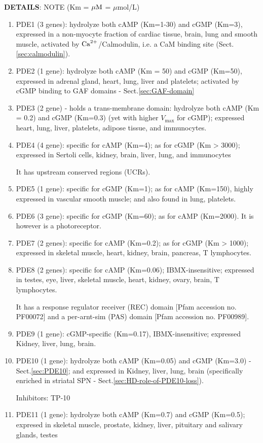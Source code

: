 {\bf DETAILS}: NOTE (Km = ${\mu\text{M}}$ = $\mu$mol/L)
\begin{enumerate}
  
  \item PDE1 (3 genes): hydrolyze both cAMP (Km=1-30) and cGMP (Km=3), expressed
  in a non-myocyte fraction of cardiac tissue, brain, lung and smooth muscle,
  activated by ${\text{Ca}^{2+}}$/Calmodulin, i.e. a CaM binding site (Sect.\ref{sec:calmodulin}).
  
  \item PDE2 (1 gene): hydrolyze both cAMP (Km = 50) and cGMP (Km=50), expressed
  in adrenal gland, heart, lung, liver and platelets; activated by cGMP
  binding to GAF domains - Sect.\ref{sec:GAF-domain}
  
  \item PDE3 (2 gene) - holds a trans-membrane domain: hydrolyze both cAMP (Km =
  0.2) and cGMP (Km=0.3) (yet with higher $V_\max$ for cGMP); expressed 
  heart, lung, liver, platelets, adipose tissue, and immunocytes.
  
  \item PDE4 (4 gene): specific for cAMP (Km=4); as for cGMP (Km > 3000);
  expressed in Sertoli cells, kidney, brain, liver, lung, and immunocytes
  
  It has upstream conserved regions (UCRs).
  
  \item PDE5 (1 gene): specific for cGMP (Km=1); as for cAMP (Km=150), highly
  expressed in vascular smooth muscle; and also found in lung, platelets.
  
  \item PDE6 (3 gene): specific for cGMP (Km=60); as for cAMP (Km=2000). It is
  however is a photoreceptor.
  
  \item PDE7 (2 genes): specific for cAMP (Km=0.2); as for cGMP (Km > 1000);
  expressed in skeletal muscle, heart, kidney, brain, pancreas, T lymphocytes.
  
  \item PDE8 (2 genes): specific for cAMP (Km=0.06); IBMX-insensitive;
  expressed in testes, eye, liver, skeletal muscle, heart, kidney, ovary, brain,
  T lymphocytes.

It has a response regulator receiver (REC) domain [Pfam accession
no. PF00072] and a per-arnt-sim (PAS) domain [Pfam accession no. PF00989].

  \item PDE9 (1 gene): cGMP-specific (Km=0.17), IBMX-insensitive;
  expressed Kidney, liver, lung, brain.
  
  \item PDE10 (1 gene): hydrolyze both cAMP (Km=0.05) and cGMP (Km=3.0) -
  Sect.\ref{sec:PDE10}; and expressed in Kidney, liver, lung, brain
  (specifically enriched in striatal SPN -
  Sect.\ref{sec:HD-role-of-PDE10-loss}).
  
  Inhibitors: TP-10

  \item PDE11 (1 gene): hydrolyze both cAMP (Km=0.7) and cGMP (Km=0.5); 
  expresed in skeletal muscle, prostate, kidney, liver, pituitary and salivary
  glands, testes
\end{enumerate}
